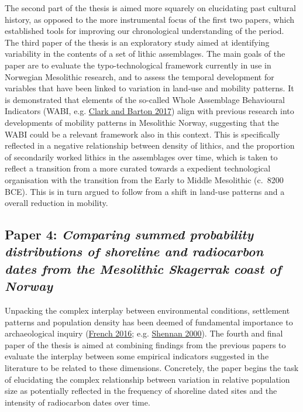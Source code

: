 \documentclass[
  12pt,
  a4paper,
  oneside]{book}
\begin{document}
The second part of the thesis is aimed more squarely on elucidating past cultural history, as opposed to the more instrumental focus of the first two papers, which established tools for improving our chronological understanding of the period. The third paper of the thesis is an exploratory study aimed at identifying variability in the contents of a set of lithic assemblages. The main goals of the paper are to evaluate the typo-technological framework currently in use in Norwegian Mesolithic research, and to assess the temporal development for variables that have been linked to variation in land-use and mobility patterns. It is demonstrated that elements of the so-called Whole Assemblage Behavioural Indicators (WABI, e.g. \protect\hyperlink{ref-clark2017}{Clark and Barton 2017}) align with previous research into developments of mobility patterns in Mesolithic Norway, suggesting that the WABI could be a relevant framework also in this context. This is specifically reflected in a negative relationship between density of lithics, and the proportion of secondarily worked lithics in the assemblages over time, which is taken to reflect a transition from a more curated towards a expedient technological organisation with the transition from the Early to Middle Mesolithic (c.~8200 BCE). This is in turn argued to follow from a shift in land-use patterns and a overall reduction in mobility.

\hypertarget{paper-4-comparing-summed-probability-distributions-of-shoreline-and-radiocarbon-dates-from-the-mesolithic-skagerrak-coast-of-norway}{%
\subsection{\texorpdfstring{Paper 4: \emph{Comparing summed probability distributions of shoreline and radiocarbon dates from the Mesolithic Skagerrak coast of Norway}}{Paper 4: Comparing summed probability distributions of shoreline and radiocarbon dates from the Mesolithic Skagerrak coast of Norway}}\label{paper-4-comparing-summed-probability-distributions-of-shoreline-and-radiocarbon-dates-from-the-mesolithic-skagerrak-coast-of-norway}}

Unpacking the complex interplay between environmental conditions, settlement patterns and population density has been deemed of fundamental importance to archaeological inquiry (\protect\hyperlink{ref-french2016}{French 2016}; e.g. \protect\hyperlink{ref-shennan2000}{Shennan 2000}). The fourth and final paper of the thesis is aimed at combining findings from the previous papers to evaluate the interplay between some empirical indicators suggested in the literature to be related to these dimensions. Concretely, the paper begins the task of elucidating the complex relationship between variation in relative population size as potentially reflected in the frequency of shoreline dated sites and the intensity of radiocarbon dates over time.
\end{document}
